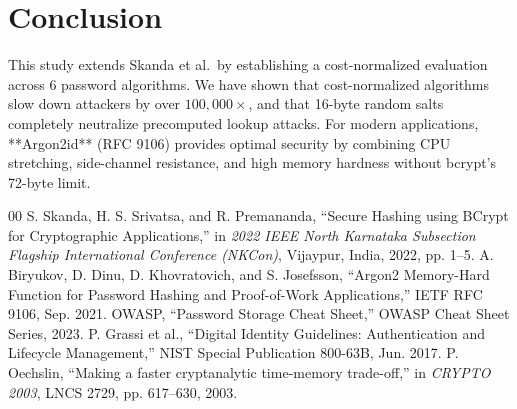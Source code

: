 \documentclass[conference]{IEEEtran}
\begin{document}
\section{Conclusion}
This study extends Skanda et al.\ by establishing a cost-normalized evaluation across 6 password algorithms. We have shown that cost-normalized algorithms slow down attackers by over $100,000\times$, and that 16-byte random salts completely neutralize precomputed lookup attacks. For modern applications, **Argon2id** (RFC 9106) provides optimal security by combining CPU stretching, side-channel resistance, and high memory hardness without bcrypt's 72-byte limit.

\begin{thebibliography}{00}
 S. Skanda, H. S. Srivatsa, and R. Premananda, ``Secure Hashing using BCrypt for Cryptographic Applications,'' in \textit{2022 IEEE North Karnataka Subsection Flagship International Conference (NKCon)}, Vijaypur, India, 2022, pp. 1--5.
 A. Biryukov, D. Dinu, D. Khovratovich, and S. Josefsson, ``Argon2 Memory-Hard Function for Password Hashing and Proof-of-Work Applications,'' IETF RFC 9106, Sep. 2021.
 OWASP, ``Password Storage Cheat Sheet,'' OWASP Cheat Sheet Series, 2023.
 P. Grassi et al., ``Digital Identity Guidelines: Authentication and Lifecycle Management,'' NIST Special Publication 800-63B, Jun. 2017.
 P. Oechslin, ``Making a faster cryptanalytic time-memory trade-off,'' in \textit{CRYPTO 2003}, LNCS 2729, pp. 617--630, 2003.
\end{thebibliography}
\end{document}
